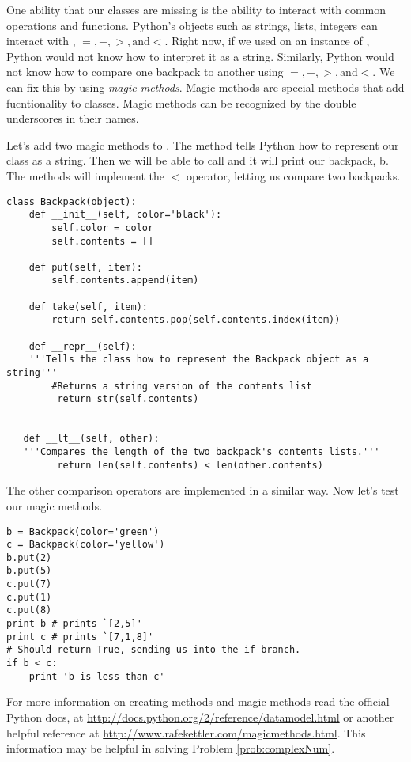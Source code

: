 One ability that our classes are missing is the ability to interact with common operations and functions.
Python's objects such as strings, lists, integers can interact with ,  $ =, - , >, \text{and} <$.
Right now, if we used  on an instance of , Python would not know how to interpret it as a string.
Similarly, Python would not know how to compare one backpack to another using $ =, - , >, \text{and} <$.
We can fix this by using \emph{magic methods}.
Magic methods are special methods that add fucntionality to classes.
Magic methods can be recognized by the double underscores in their names.

Let's add two magic methods to . 
The  method tells Python how to represent our class as a string. 
Then we will be able to call  and it will print our backpack, b.
The  methods will implement the $<$ operator, letting us compare two backpacks.

\begin{lstlisting}
class Backpack(object):
    def __init__(self, color='black'):
    	self.color = color
    	self.contents = []
        
    def put(self, item):
    	self.contents.append(item)
        
    def take(self, item):
    	return self.contents.pop(self.contents.index(item)) 

    def __repr__(self):
    '''Tells the class how to represent the Backpack object as a string'''
    	#Returns a string version of the contents list
    	 return str(self.contents)
             
   
   def __lt__(self, other):
   '''Compares the length of the two backpack's contents lists.'''
     	 return len(self.contents) < len(other.contents)

\end{lstlisting}

The other comparison operators are implemented in a similar way.
Now let's test our magic methods.

\begin{lstlisting}
b = Backpack(color='green')
c = Backpack(color='yellow')
b.put(2)
b.put(5)
c.put(7)
c.put(1)
c.put(8)
print b # prints `[2,5]'
print c # prints `[7,1,8]'
# Should return True, sending us into the if branch.
if b < c: 
	print 'b is less than c'

\end{lstlisting}

For more information on creating methods and magic methods read the official Python docs, at \url {http://docs.python.org/2/reference/datamodel.html} or another helpful reference at \url{http://www.rafekettler.com/magicmethods.html}.
This information may be helpful in solving Problem \ref{prob:complexNum}.

